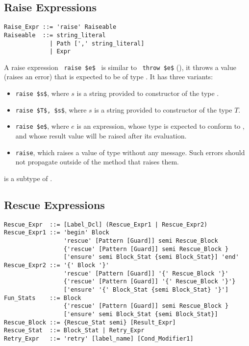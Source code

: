 \subsection{Raise Expressions}

\syntax\begin{lstlisting}
Raise_Expr ::= 'raise' Raiseable
Raiseable  ::= string_literal
             | Path [',' string_literal]
             | Expr
\end{lstlisting}

A raise expression ~\lstinline!raise $e$!~ is similar to ~\lstinline!throw $e$! (), it throws a value (raises an error) that is expected to be of type . It has three variants: 
\begin{itemize}
\item[] \lstinline!raise $s$!, where $s$ is a string provided to constructor of the type . 
\item[] \lstinline!raise $T$, $s$!, where $s$ is a string provided to constructor of the type $T$. 
\item[] \lstinline!raise $e$!, where $e$ is an expression, whose type is expected to conform to , and whose result value will be raised after its evaluation. 
\item[] \lstinline!raise!, which raises a value of type  without any message. Such errors should not propagate outside of the method that raises them. 
\end{itemize}

 is a subtype of . 







\subsection{Rescue Expressions}

\syntax\begin{lstlisting}
Rescue_Expr  ::= [Label_Dcl] (Rescue_Expr1 | Rescue_Expr2)
Rescue_Expr1 ::= 'begin' Block 
                 'rescue' [Pattern [Guard]] semi Rescue_Block
                 {'rescue' [Pattern [Guard]] semi Rescue_Block }
                 ['ensure' semi Block_Stat {semi Block_Stat}] 'end'
Rescue_Expr2 ::= '{' Block '}' 
                 'rescue' [Pattern [Guard]] '{' Rescue_Block '}'
                 {'rescue' [Pattern [Guard]] '{' Rescue_Block '}'}
                 ['ensure' '{' Block_Stat {semi Block_Stat} '}']
Fun_Stats    ::= Block
                 {'rescue' [Pattern [Guard]] semi Rescue_Block }
                 ['ensure' semi Block_Stat {semi Block_Stat}]
Rescue_Block ::= {Rescue_Stat semi} [Result_Expr]
Rescue_Stat  ::= Block_Stat | Retry_Expr
Retry_Expr   ::= 'retry' [label_name] [Cond_Modifier1]
\end{lstlisting}

